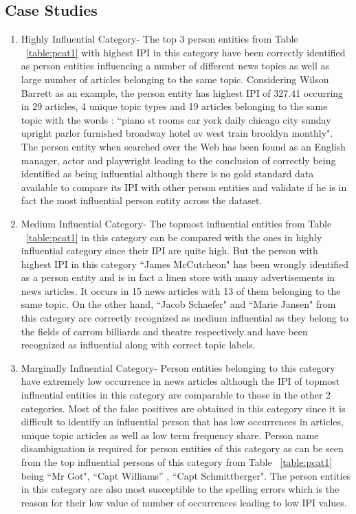 \subsection{Case Studies}


\begin{enumerate}

\item
Highly Influential Category- The top 3 person entities from Table ~\ref{table:pcat1} with highest IPI in this category have been correctly identified as person entities influencing a number of different news topics as well as large number of articles belonging to the same topic. Considering Wilson Barrett as an example, the person entity has highest IPI of 327.41 occurring in 29 articles, 4 unique topic types and 19 articles belonging to the same topic with the words : ``piano st rooms car york daily chicago city sunday upright parlor furnished broadway hotel av west train brooklyn monthly". The person entity when searched over the Web has been found as an English manager, actor and playwright leading to the conclusion of correctly being identified as being influential although there is no gold standard data available to compare its IPI with other person entities and validate if he is in fact the most influential person entity across the dataset.

\item
Medium Influential Category- The topmost influential entities from Table ~\ref{table:pcat1} in this category can be compared with the ones in highly influential category since their IPI are quite high. But the person with highest IPI in this category ``James McCutcheon" has been wrongly identified as a person entity and is in fact a linen store with many advertisements in news articles. It occurs in 15 news articles with 13 of them belonging to the same topic. On the other hand, ``Jacob Schaefer" and ``Marie Jansen" from this category are correctly recognized as medium influential as they belong to the fields of carrom billiards and theatre respectively and have been recognized as influential along with correct topic labels.
 
\item
Marginally Influential Category- Person entities belonging to this category have extremely low occurrence in news articles although the IPI of topmost influential entities in this category are comparable to those in the other 2 categories. Most of the false positives are obtained in this category since it is difficult to identify an influential person that has low occurrences in articles, unique topic articles as well as low term frequency share.  Person name disambiguation is required for person entities of this category as can be seen from the top influential persons of this category from Table ~\ref{table:pcat1} being ``Mr Got", ``Capt Williams'' , ``Capt Schmittberger". The person entities in this category are also most susceptible to the spelling errors which is the reason for their low value of number of occurrences leading to low IPI values.

\end{enumerate}

